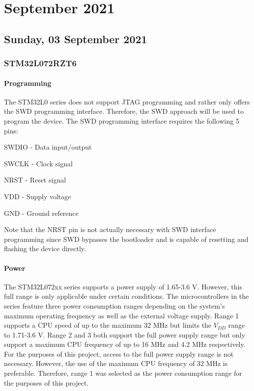 \chapter[2021 September]{September 2021}

\section[2021/09/03]{Sunday, 03 September 2021}

\subsection{STM32L072RZT6}

\subsubsection{Programming}

The STM32L0 series does not support \ac{JTAG} programming and rather only offers the \ac{SWD} programming interface. Therefore, the \ac{SWD} approach will be used to program the device. The \ac{SWD} programming interface requires the following 5 pins:

\begin{compactitem}
	\item SWDIO - Data input/output
	\item SWCLK - Clock signal
	\item NRST - Reset signal
	\item VDD - Supply voltage
	\item GND - Ground reference
\end{compactitem}

Note that the NRST pin is not actually necessary with \ac{SWD} interface programming since \ac{SWD} bypasses the bootloader and is capable of resetting and flashing the device directly.

\subsubsection{Power}

The STM32L072xx series supports a power supply of 1.65-3.6 V. However, this full range is only applicable under certain conditions. The microcontrollers in the series feature three power consumption ranges depending on the system's maximum operating frequency as well as the external voltage supply. Range 1 supports a CPU speed of up to the maximum 32 MHz but limits the $V_{DD}$ range to 1.71-3.6 V. Range 2 and 3 both support the full power supply range but only support a maximum CPU frequency of up to 16 MHz and 4.2 MHz respectively. For the purposes of this project, access to the full power supply range is not necessary. However, the use of the maximum CPU frequency of 32 MHz is preferable. Therefore, range 1 was selected as the power consumption range for the purposes of this project.

